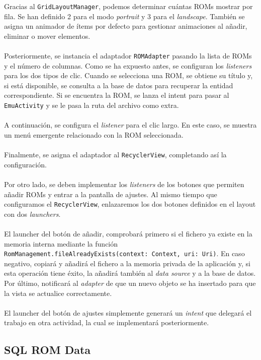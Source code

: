 Gracias al \texttt{GridLayoutManager}, podemos determinar cuántas ROMs mostrar por fila. Se han definido 2 para el modo \textit{portrait} y 3 para el \textit{landscape}. También se asigna un animador de ítems por defecto para gestionar animaciones al añadir, eliminar o mover elementos.
\\\\
Posteriormente, se instancia el adaptador \texttt{ROMAdapter} pasando la lista de ROMs y el número de columnas. Como se ha expuesto antes, se configuran los \textit{listeners} para los dos tipos de clic. Cuando se selecciona una ROM, se obtiene su título y, si está disponible, se consulta a la base de datos para recuperar la entidad correspondiente. Si se encuentra la ROM, se lanza el intent para pasar al \texttt{EmuActivity} y se le pasa la ruta del archivo como extra.
\\\\
A continuación, se configura el \textit{listener} para el clic largo. En este caso, se muestra un menú emergente relacionado con la ROM seleccionada. 
\\\\
Finalmente, se asigna el adaptador al \texttt{RecyclerView}, completando así la configuración.
\\\\
Por otro lado, se deben implementar los \textit{listeners} de los botones que permiten añadir ROMs y entrar a la pantalla de ajustes. Al mismo tiempo que configuramos el \texttt{RecyclerView}, enlazaremos los dos botones definidos en el layout con dos \textit{launchers}.
\\\\
El launcher del botón de añadir, comprobará primero si el fichero ya existe en la memoria interna mediante la función \texttt{RomManagement.fileAlreadyExists(context: Context, uri: Uri)}. En caso negativo, copiará y añadirá el fichero a la memoria privada de la aplicación y, si esta operación tiene éxito, la añadirá también al \textit{data source} y a la base de datos. Por último, notificará al \textit{adapter} de que un nuevo objeto se ha insertado para que la vista se actualice correctamente.
\\\\
El launcher del botón de ajustes simplemente generará un \textit{intent} que delegará el trabajo en otra actividad, la cual se implementará posteriormente.

\subsection{SQL ROM Data}

